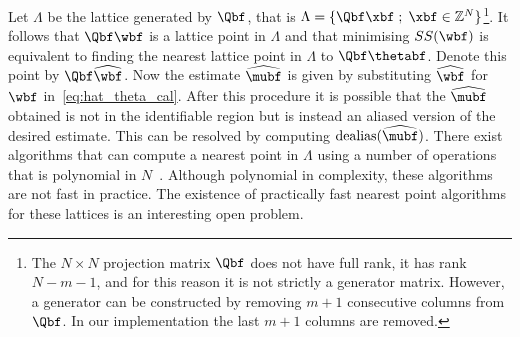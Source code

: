\documentclass[journal]{IEEEtran}
\begin{document}
Let $\Lambda$ be the lattice generated by $\Qbf$, that is $\Lambda = \{\Qbf\xbf \mid \xbf \in \ints^N \}$\footnote{The $N \times N$ projection matrix $\Qbf$ does not have full rank, it has rank $N-m-1$, and for this reason it is not strictly a generator matrix.  However, a generator can be constructed by removing $m+1$ consecutive columns from $\Qbf$. In our implementation the last $m+1$ columns are removed.}.  It follows that $\Qbf \wbf$ is a lattice point in $\Lambda$ and that minimising $SS(\wbf)$ is equivalent to finding the nearest lattice point in $\Lambda$ to $\Qbf\thetabf$.  Denote this point by $\Qbf\widehat{\wbf}$.  Now the estimate $\widehat{\mubf}$ is given by substituting $\widehat{\wbf}$ for $\wbf$ in~\eqref{eq:hat_theta_cal}.  After this procedure it is possible that the $\widehat{\mubf}$ obtained is not in the identifiable region but is instead an aliased version of the desired estimate. This can be resolved by computing $\dealias(\widehat{\mubf})$.  
There exist algorithms that can compute a nearest point in $\Lambda$ using a number of operations that is polynomial in $N$~\cite[Sec 4.3]{McKilliam2010thesis}.  Although polynomial in complexity, these algorithms are not fast in practice.  The existence of practically fast nearest point algorithms for these lattices is an interesting open problem.
\end{document}

